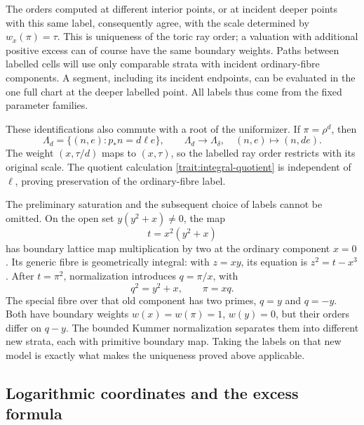 The orders computed at different interior points, or at
incident deeper points with this same label, consequently
agree, with the scale determined by \(w_x(\pi)=\tau\).
This is uniqueness of the toric ray order; a valuation with
additional positive excess can of course have the same
boundary weights.  Paths between labelled cells will use
only comparable strata with incident ordinary-fibre
components.  A segment, including its incident endpoints,
can be evaluated in the one full chart at the deeper labelled
point.  All labels thus come from the fixed parameter families.

These identifications also commute with a root of the
uniformizer.  If \(\pi=\rho^d\), then
\begin{equation}
 \Lambda_d=\{(n,e):p_*n=d\ell e\},\qquad
 \Lambda_d\longrightarrow\Lambda_\delta,\quad
 (n,e)\longmapsto(n,de).
 \label{trait:root-lattice}
\end{equation}
The weight \((x,\tau/d)\) maps to \((x,\tau)\), so the labelled
ray order restricts with its original scale.  The quotient
calculation \eqref{trait:integral-quotient} is independent of
\(\ell\), proving preservation of the ordinary-fibre label.

\begin{remark}
The preliminary saturation and the subsequent choice of
labels cannot be omitted.  On the open set
\(y(y^2+x)\ne0\), the map
\[
 t=x^2(y^2+x)
\]
has boundary lattice map multiplication by two at the
ordinary component \(x=0\).  Its generic fibre is
geometrically integral: with \(z=xy\), its equation is
\(z^2=t-x^3\).  After \(t=\pi^2\), normalization introduces
\(q=\pi/x\), with
\[
 q^2=y^2+x,\qquad \pi=xq.
\]
The special fibre over that old component has two primes,
\(q=y\) and \(q=-y\).  Both have boundary weights
\(w(x)=w(\pi)=1\), \(w(y)=0\), but their orders differ on
\(q-y\).  The bounded Kummer normalization separates them
into different new strata, each with primitive boundary
map.  Taking the labels on that new model is exactly what
makes the uniqueness proved above applicable.
\end{remark}

\subsection{Logarithmic coordinates and the excess formula}

